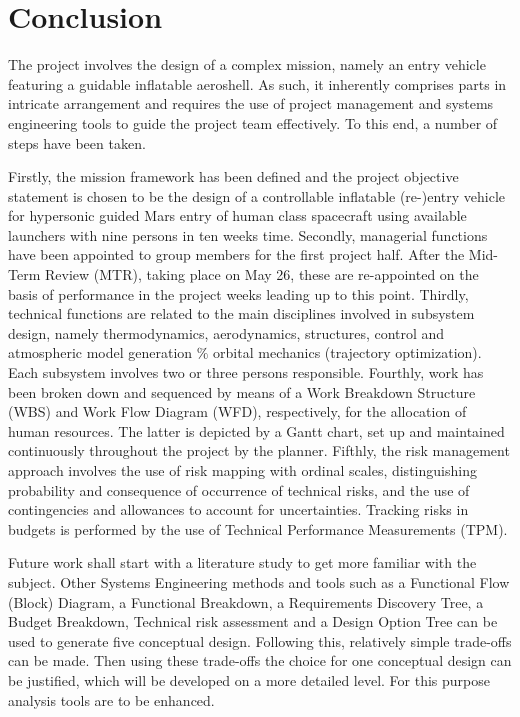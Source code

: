 \section{Conclusion}\label{cha:conclusion}
The project involves the design of a complex mission, namely an entry vehicle featuring a guidable inflatable aeroshell. As such, it inherently comprises parts in intricate arrangement and requires the use of project management and systems engineering tools to guide the project team effectively. To this end, a number of steps have been taken. 

Firstly, the mission framework has been defined and the project objective statement is chosen to be the design of a controllable inflatable (re-)entry vehicle for hypersonic guided Mars entry of human class spacecraft using available launchers with nine persons in ten weeks time.  Secondly, managerial functions have been appointed to group members for the first project half. After the Mid-Term Review (MTR), taking place on May 26, these are re-appointed on the basis of performance in the project weeks leading up to this point. Thirdly, technical functions are related to the main disciplines involved in subsystem design, namely thermodynamics, aerodynamics, structures, control and atmospheric model generation $\%$ orbital mechanics (trajectory optimization). Each subsystem involves two or three persons responsible. Fourthly, work has been broken down  and sequenced by means of a Work Breakdown Structure (WBS) and Work Flow Diagram (WFD), respectively, for the allocation of human resources. The latter is depicted by a Gantt chart, set up and maintained continuously throughout the project by the planner. Fifthly, the risk management approach involves the use of risk mapping with ordinal scales, distinguishing probability and consequence of occurrence of technical risks, and the use of contingencies and allowances to account for uncertainties. Tracking risks in budgets is performed by the use of Technical Performance Measurements (TPM).

Future work shall start with a literature study to get more familiar with the subject. Other Systems Engineering methods and tools such as a Functional Flow (Block) Diagram, a Functional Breakdown, a Requirements Discovery Tree, a Budget Breakdown, Technical risk assessment and a Design Option Tree can be used to generate five conceptual design. Following this, relatively simple trade-offs can be made. Then using these trade-offs the choice for one conceptual design can be justified, which will be developed on a more detailed level. For this purpose analysis tools are to be enhanced.